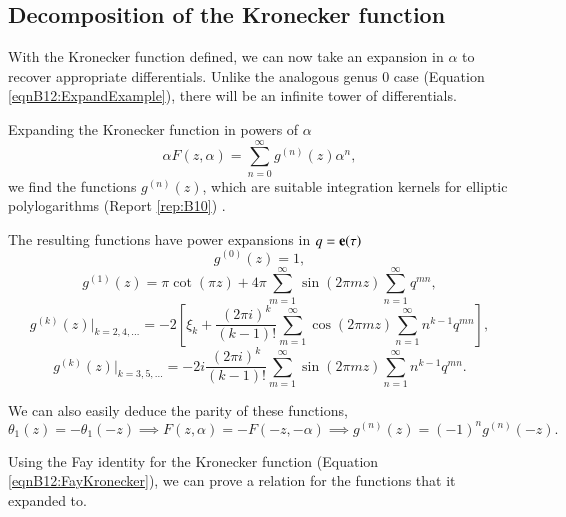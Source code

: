 \subsection{Decomposition of the Kronecker function}

With the Kronecker function defined, we can now take an expansion in $\alpha$ to recover appropriate differentials. Unlike the analogous genus 0 case (Equation \ref{eqnB12:ExpandExample}), there will be an infinite tower of differentials.

\begin{definition}
    Expanding the Kronecker function in powers of $\alpha$
    \begin{equation}
        \alpha F(z,\alpha) = \sum_{n=0}^{\infty} g^{(n)}(z) \alpha^n,
    \end{equation}
    we find the functions $g^{(n)}(z)$, which are suitable integration kernels for elliptic polylogarithms (Report \ref{rep:B10}) \cite{Broedel_2022}.
\end{definition}

The resulting functions have power expansions in $q = \mathbf{e}(\tau)$ \cite{Broedel_2015}
\begin{equation}
    g^{(0)}(z) = 1,
\end{equation}
\begin{equation}
    g^{(1)}(z) = \pi \cot(\pi z) + 4 \pi \sum_{m=1}^\infty \sin(2 \pi m z) \sum_{n=1}^\infty q^{mn},
\end{equation}
\begin{equation}
    g^{(k)}(z)\big|_{k=2,4,\ldots} = -2\left[\xi_k + \frac{(2\pi i)^k}{(k-1)!} \sum_{m=1}^\infty \cos(2 \pi m z) \sum_{n=1}^\infty n^{k-1} q^{mn} \right],
\end{equation}
\begin{equation}
    g^{(k)}(z)\big|_{k=3,5,\ldots} = -2i \frac{(2\pi i)^k}{(k-1)!} \sum_{m=1}^\infty \sin(2\pi mz) \sum_{n=1}^\infty n^{k-1} q^{mn}.
\end{equation}

We can also easily deduce the parity of these functions,
\begin{equation}
    \theta_1(z) = -\theta_1(-z) \implies F(z,\alpha) = -F(-z,-\alpha) \implies g^{(n)}(z)=(-1)^n g^{(n)}(-z).
\end{equation}


Using the Fay identity for the Kronecker function (Equation \ref{eqnB12:FayKronecker}), we can prove a relation for the functions that it expanded to.

